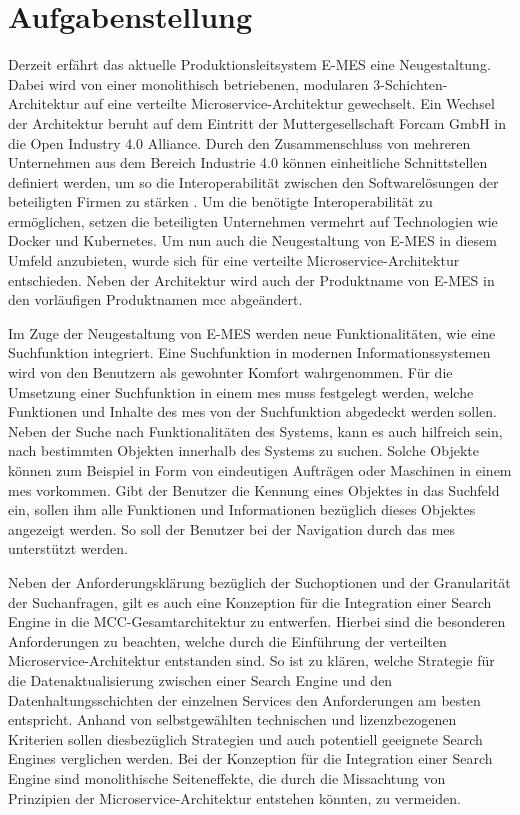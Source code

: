 \section{Aufgabenstellung\label{sec1.2:Unterpunkt-2}}

Derzeit erfährt das aktuelle Produktionsleitsystem E-MES eine Neugestaltung. Dabei wird von einer monolithisch betriebenen, modularen 3-Schichten-Architektur auf eine verteilte Microservice-Architektur gewechselt. Ein Wechsel der Architektur beruht auf dem Eintritt der Muttergesellschaft Forcam GmbH in die \glqq Open Industry 4.0 Alliance\grqq{}. Durch den Zusammenschluss von mehreren Unternehmen aus dem Bereich \glqq Industrie 4.0\grqq{} können einheitliche Schnittstellen definiert werden, um so die Interoperabilität zwischen den Softwarelösungen der beteiligten Firmen zu stärken \cite{OpenIndustry4.0Alliance.2021}. Um die benötigte Interoperabilität zu ermöglichen, setzen die beteiligten Unternehmen vermehrt auf Technologien wie Docker und Kubernetes. Um nun auch die Neugestaltung von E-MES in diesem Umfeld anzubieten, wurde sich für eine verteilte Microservice-Architektur entschieden. Neben der Architektur wird auch der Produktname von \glqq E-MES\grqq{} in den vorläufigen Produktnamen \glqq \gls{mcc}\grqq{} abgeändert.

Im Zuge der Neugestaltung von E-MES werden neue Funktionalitäten, wie eine Suchfunktion integriert. Eine Suchfunktion in modernen Informationssystemen wird von den Benutzern als gewohnter Komfort wahrgenommen. Für die Umsetzung einer Suchfunktion in einem \gls{mes} muss festgelegt werden, welche Funktionen und Inhalte des \gls{mes} von der Suchfunktion abgedeckt werden sollen. Neben der Suche nach Funktionalitäten des Systems, kann es auch hilfreich sein, nach bestimmten \glqq Objekten\grqq{} innerhalb des Systems zu suchen. Solche Objekte können zum Beispiel in Form von eindeutigen Aufträgen oder Maschinen in einem \gls{mes} vorkommen. Gibt der Benutzer die Kennung eines Objektes in das Suchfeld ein, sollen ihm alle Funktionen und Informationen bezüglich dieses Objektes angezeigt werden. So soll der Benutzer bei der Navigation durch das \gls{mes} unterstützt werden.

Neben der Anforderungsklärung bezüglich der Suchoptionen und der Granularität der Suchanfragen, gilt es auch eine Konzeption für die Integration einer Search Engine in die MCC-Gesamtarchitektur zu entwerfen. Hierbei sind die besonderen Anforderungen zu beachten, welche durch die Einführung der verteilten Microservice-Architektur entstanden sind. So ist zu klären, welche Strategie für die Datenaktualisierung zwischen einer Search Engine und den Datenhaltungsschichten der einzelnen Services den Anforderungen am besten entspricht. Anhand von selbstgewählten technischen und lizenzbezogenen Kriterien sollen diesbezüglich Strategien und auch potentiell geeignete Search Engines verglichen werden. Bei der Konzeption für die Integration einer Search Engine sind monolithische Seiteneffekte, die durch die Missachtung von Prinzipien der Microservice-Architektur entstehen könnten, zu vermeiden.

